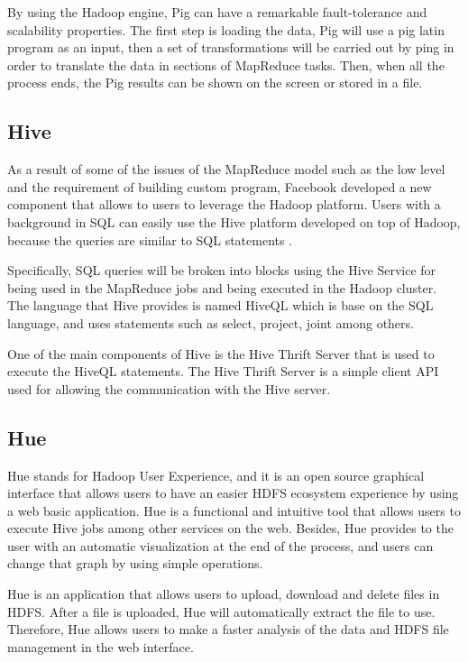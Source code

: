 By using the Hadoop engine, Pig can have a remarkable fault-tolerance and scalability properties. 
The first step is loading the data, Pig will use a pig latin program as an input, then a set of transformations will be carried out by ping in order to translate the data in sections of MapReduce tasks. Then, when all the process ends, the Pig results can be shown on the screen or stored in a file.
 
\subsection{Hive}

As a result of some of the issues of the MapReduce model such as the low level and the requirement of building custom program, Facebook developed a new component that allows to users to leverage the Hadoop platform.  Users with a background in SQL can easily use the Hive platform developed on top of Hadoop, because the queries are similar to SQL statements \cite{thusoo2009hive}.

Specifically, SQL queries will be broken into blocks using the Hive Service for being used in the MapReduce jobs and being executed in the Hadoop cluster. The language that Hive provides is named HiveQL which is base on the SQL language, and uses statements such as select, project, joint among others. 

One of the main components of Hive is the Hive Thrift Server that is used to execute the HiveQL statements. The Hive Thrift Server is a simple client API used for allowing the communication with the Hive server. 
  
\subsection{Hue}

Hue \cite{rasheed2013fedora} stands for Hadoop User Experience, and it is an open source graphical interface that allows users to have an easier HDFS ecosystem experience by using a web basic application. Hue is a functional and intuitive tool that allows users to execute Hive jobs among other services on the web. Besides, Hue provides to the user with an automatic visualization at the end of the process, and users can change that graph by using simple operations.

Hue \cite{b2016professionalhadoop} is an application that allows users to upload, download and delete files in HDFS. After a file is uploaded, Hue will automatically extract the file to use. Therefore, Hue allows users to make a faster analysis of the data and HDFS file management in the web interface. 









  
